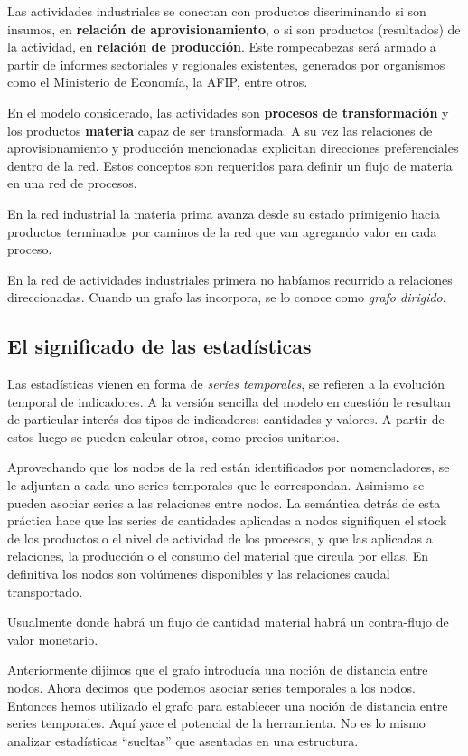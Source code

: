 \documentclass[a4paper]{report}
\begin{document}
Las actividades industriales se conectan con productos discriminando si son insumos, en \textbf{relación de aprovisionamiento}, o si son productos (resultados) de la actividad, en \textbf{relación de producción}. Este rompecabezas será armado a partir de informes sectoriales y regionales existentes, generados por organismos como el Ministerio de Economía, la AFIP, entre otros.

En el modelo considerado, las actividades son \textbf{procesos de transformación} y los productos \textbf{materia} capaz de ser transformada. A su vez las relaciones de aprovisionamiento y producción mencionadas explicitan direcciones preferenciales dentro de la red. Estos conceptos son requeridos para definir un flujo de materia en una red de procesos.

En la red industrial la materia prima avanza desde su estado primigenio hacia productos terminados por caminos de la red que van agregando valor en cada proceso.

En la red de actividades industriales primera no habíamos recurrido a relaciones direccionadas. Cuando un grafo las incorpora, se lo conoce como \textit{grafo dirigido}.

\subsection*{El significado de las estadísticas}

Las estadísticas vienen en forma de \textit{series temporales}, se refieren a la evolución temporal de indicadores. A la versión sencilla del modelo en cuestión le resultan de particular interés dos tipos de indicadores: cantidades y valores. A partir de estos luego se pueden calcular otros, como precios unitarios.

Aprovechando que los nodos de la red están identificados por nomencladores, se le adjuntan a cada uno series temporales que le correspondan. Asimismo se pueden asociar series a las relaciones entre nodos. La semántica detrás de esta práctica hace que las series de cantidades aplicadas a nodos signifiquen el stock de los productos o el nivel de actividad de los procesos, y que las aplicadas a relaciones, la producción o el consumo del material que circula por ellas. En definitiva los nodos son volúmenes disponibles y las relaciones caudal transportado.

Usualmente donde habrá un flujo de cantidad material habrá un contra-flujo de valor monetario.

Anteriormente dijimos que el grafo introducía una noción de distancia entre nodos. Ahora decimos que podemos asociar series temporales a los nodos. Entonces hemos utilizado el grafo para establecer una noción de distancia entre series temporales. Aquí yace el potencial de la herramienta. No es lo mismo analizar estadísticas ``sueltas'' que asentadas en una estructura.
\end{document}
